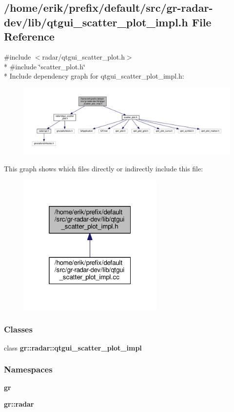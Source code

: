 \subsection{/home/erik/prefix/default/src/gr-\/radar-\/dev/lib/qtgui\+\_\+scatter\+\_\+plot\+\_\+impl.h File Reference}
\label{qtgui__scatter__plot__impl_8h}
{\ttfamily \#include $<$radar/qtgui\+\_\+scatter\+\_\+plot.\+h$>$}\\*
{\ttfamily \#include \char`\"{}scatter\+\_\+plot.\+h\char`\"{}}\\*
Include dependency graph for qtgui\+\_\+scatter\+\_\+plot\+\_\+impl.\+h\+:
\nopagebreak
\begin{figure}[H]
\begin{center}
\leavevmode
\includegraphics[width=350pt]{dd/da9/qtgui__scatter__plot__impl_8h__incl}
\end{center}
\end{figure}
This graph shows which files directly or indirectly include this file\+:
\nopagebreak
\begin{figure}[H]
\begin{center}
\leavevmode
\includegraphics[width=205pt]{db/d80/qtgui__scatter__plot__impl_8h__dep__incl}
\end{center}
\end{figure}
\subsubsection*{Classes}
\begin{DoxyCompactItemize}
\item 
class {\bf gr\+::radar\+::qtgui\+\_\+scatter\+\_\+plot\+\_\+impl}
\end{DoxyCompactItemize}
\subsubsection*{Namespaces}
\begin{DoxyCompactItemize}
\item 
 {\bf gr}
\item 
 {\bf gr\+::radar}
\end{DoxyCompactItemize}
